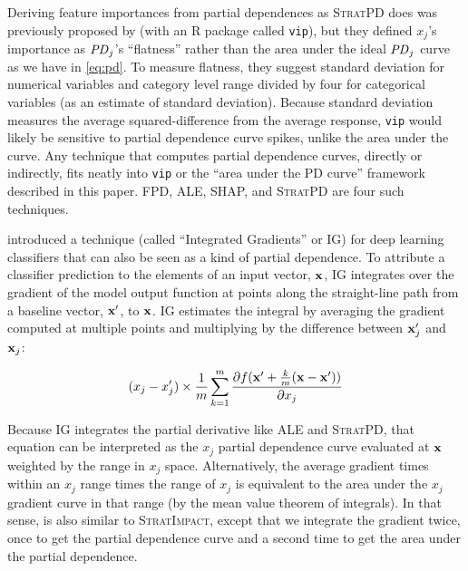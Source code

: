 \documentclass[11pt]{article}
\newcommand{\simp}{\fontfamily{cmr}\textsc{\small StratImpact}}
\newcommand{\spd}{\fontfamily{cmr}\textsc{\small StratPD}}
\begin{document}
Deriving feature importances from partial dependences as \spd{} does was previously proposed by \cite{pdvim} (with an R package called {\tt vip}), but they defined $x_j$'s importance as ${\it PD}_j$'s ``flatness'' rather than the area under the ideal ${\it PD}_j$ curve as we have in \eqref{eq:pd}. To measure flatness, they suggest standard deviation for numerical variables and category level range divided by four for categorical variables (as an estimate of standard deviation).  Because standard deviation measures the average squared-difference from the average response, {\tt vip} would likely be sensitive to partial dependence curve spikes, unlike the area under the curve.  Any technique that computes partial dependence curves, directly or indirectly, fits neatly into {\tt vip} or the ``area under the PD curve'' framework described in this paper. FPD, ALE, SHAP, and \spd{} are four such techniques.

\citet{intgrad} introduced a technique (called ``Integrated Gradients'' or IG) for deep learning classifiers that can also be seen as a kind of partial dependence. To attribute a classifier prediction to the elements of an input vector, $\bf x$, IG integrates over the gradient of the model output function at points along the straight-line path from a baseline vector, $\bf x'$, to $\bf x$. IG estimates the integral by averaging the gradient computed at multiple points and multiplying by the difference between ${\bf x}'_j$ and ${\bf x}_j$:

\begin{equation}
(x_j - x'_j) \times \frac{1}{m} \sum_{k=1}^{m} \frac{\partial f({\bf x}' + \frac{k}{m}({\bf x}-{\bf x}'))}{\partial x_j}
\end{equation}

\noindent  Because IG integrates the partial derivative like ALE and \spd, that equation can be interpreted as the $x_j$ partial dependence curve evaluated at $\bf x$ weighted by the range in $x_j$ space. Alternatively, the average gradient times within an $x_j$ range times the range of $x_j$ is equivalent to the area under the $x_j$ gradient curve in that range (by the mean value theorem of integrals). In that sense, \cite{intgrad} is also similar to \simp, except that we integrate the gradient twice, once to get the partial dependence curve and a second time to get the area under the partial dependence.
\end{document}
